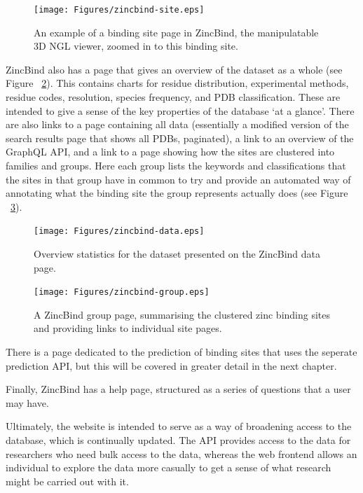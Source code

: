 \begin{figure}
\centering
\texttt{[image: Figures/zincbind-site.eps]}
\caption{\label{fig:zincbind-site} An example of a binding site page in ZincBind, the manipulatable
3D NGL viewer, zoomed in to this binding site.}
\end{figure}

ZincBind also has a page that gives an overview of the dataset as a whole (see Figure ~\ref{fig:zincbind-data}). This contains charts for residue distribution, experimental methods, residue codes, resolution, species frequency, and PDB classification. These are intended to give a sense of the key properties of the database `at a glance'. There are also links to a page containing all data (essentially a modified version of the search results page that shows all PDBs, paginated), a link to an overview of the GraphQL API, and a link to a page showing how the sites are clustered into families and groups. Here each group lists the keywords and classifications that the sites in that group have in common to try and provide an automated way of annotating what the binding site the group represents actually does (see Figure ~\ref{fig:zincbind-group}).

\begin{figure}
\centering
\texttt{[image: Figures/zincbind-data.eps]}
\caption{\label{fig:zincbind-data} Overview statistics for the dataset presented on
the ZincBind data page.}
\end{figure}

\begin{figure}
\centering
\texttt{[image: Figures/zincbind-group.eps]}
\caption{\label{fig:zincbind-group} A ZincBind group page, summarising the clustered zinc
binding sites and providing links to individual site pages.}
\end{figure}

There is a page dedicated to the prediction of binding sites that uses the seperate prediction API, but this will be covered in greater detail in the next chapter.

Finally, ZincBind has a help page, structured as a series of questions that a user may have.

Ultimately, the website is intended to serve as a way of broadening access to the database, which is continually updated. The API provides access to the data for researchers who need bulk access to the data, whereas the web frontend allows an individual to explore the data more casually to get a sense of what research might be carried out with it.


